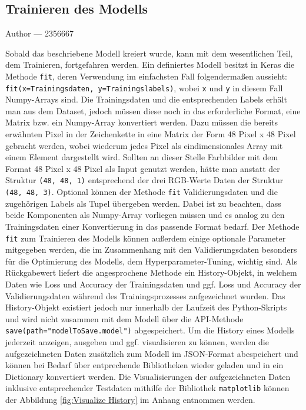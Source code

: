 \documentclass[12pt, a4paper]{report}
\makeatletter
\newcommand{\sectionauthor}[1]{%
  {\parindent0pt\vspace*{-5pt}%
  \large{Author --- }
  \linespread{1.1}\large\scshape#1%
  \par\nobreak\vspace*{35pt} }
  \@afterheading%
}
\makeatother
\begin{document}
\subsection{Trainieren des Modells}
\sectionauthor{2356667}
Sobald das beschriebene Modell kreiert wurde, kann mit dem wesentlichen Teil, dem Trainieren, fortgefahren werden. Ein definiertes Modell besitzt in Keras die Methode \texttt{fit}, deren Verwendung im einfachsten Fall folgendermaßen aussieht: \texttt{fit(x=Trainingsdaten, y=Trainingslabels)}, wobei \texttt{x} und \texttt{y} in diesem Fall Numpy-Arrays sind. Die Trainingsdaten und die entsprechenden Labels erhält man aus dem Dataset, jedoch müssen diese noch in das erforderliche Format, eine Matrix bzw. ein Numpy-Array konvertiert werden. Dazu müssen die bereits erwähnten Pixel in der Zeichenkette in eine Matrix der Form 48 Pixel x 48 Pixel gebracht werden, wobei wiederum jedes Pixel als eindimensionales Array mit einem Element dargestellt wird. Sollten an dieser Stelle Farbbilder mit dem Format 48 Pixel x 48 Pixel als Input genutzt werden, hätte man anstatt der Struktur \texttt{(48, 48, 1)} entsprechend der drei RGB-Werte Daten der Struktur \texttt{(48, 48, 3)}. Optional können der Methode \texttt{fit} Validierungsdaten und die zugehörigen Labels als Tupel übergeben werden. Dabei ist zu beachten, dass beide Komponenten als Numpy-Array vorliegen müssen und es analog zu den Trainingsdaten einer Konvertierung in das passende Format bedarf. Der Methode \texttt{fit} zum Trainieren des Modells können außerdem einige optionale Parameter mitgegeben werden, die im Zusammenhang mit den Validierungsdaten besonders für die Optimierung des Modells, dem Hyperparameter-Tuning, wichtig sind.\newline
Als Rückgabewert liefert die angesprochene Methode ein History-Objekt, in welchem Daten wie Loss und Accuracy der Trainingsdaten und ggf. Loss und Accuracy der Validierungsdaten während des Trainingsprozesses aufgezeichnet wurden. Das History-Objekt existiert jedoch nur innerhalb der Laufzeit des Python-Skripts und wird nicht zusammen mit dem Modell über die API-Methode \texttt{save(path="modelToSave.model")} abgespeichert. Um die History eines Modells jederzeit anzeigen, ausgeben und ggf. visualisieren zu können, werden die aufgezeichneten Daten zusätzlich zum Modell im JSON-Format abespeichert und können bei Bedarf über entprechende Bibliotheken wieder geladen und in ein Dictionary konvertiert werden.\newline
Die Visualisierungen der aufgezeichneten Daten inklusive entsprechender Testdaten mithilfe der Bibliothek \texttt{matplotlib} können der Abbildung \ref{fig:Visualize History} im Anhang entnommen werden.
\end{document}
